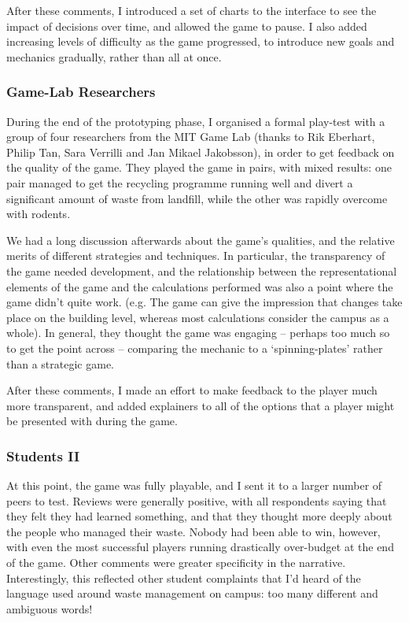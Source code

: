 \documentclass[nofonts,nols,justified,nobib]{tufte-book}
\begin{document}
After these comments, I introduced a set of charts to the interface to see the impact of decisions over time, and allowed the game to pause. I also added increasing levels of difficulty as the game progressed, to introduce new goals and mechanics gradually, rather than all at once.

\subsubsection*{Game-Lab Researchers}

During the end of the prototyping phase, I organised a formal play-test with a group of four researchers from the MIT Game Lab (thanks to Rik Eberhart, Philip Tan, Sara Verrilli and Jan Mikael Jakobsson), in order to get feedback on the quality of the game. They played the game in pairs, with mixed results: one pair managed to get the recycling programme running well and divert a significant amount of waste from landfill, while the other was rapidly overcome with rodents.


We had a long discussion afterwards about the game's qualities, and the relative merits of different strategies and techniques. In particular, the transparency of the game needed development, and the relationship between the representational elements of the game and the calculations performed was also a point where the game didn't quite work. (e.g. The game can give the impression that changes take place on the building level, whereas most calculations consider the campus as a whole). In general, they thought the game was engaging -- perhaps too much so to get the point across -- comparing the mechanic to a `spinning-plates' rather than a strategic game.

After these comments, I made an effort to make feedback to the player much more transparent, and added explainers to all of the options that a player might be presented with during the game. 

\subsubsection*{Students II}

At this point, the game was fully playable, and I sent it to a larger number of peers to test. Reviews were generally positive, with all respondents saying that they felt they had learned something, and that they thought more deeply about the people who managed their waste. Nobody had been able to win, however, with even the most successful players running drastically over-budget at the end of the game. Other comments were greater specificity in the narrative. Interestingly, this reflected other student complaints that I'd heard of the language used around waste management on campus: too many different and ambiguous words!
\end{document}
